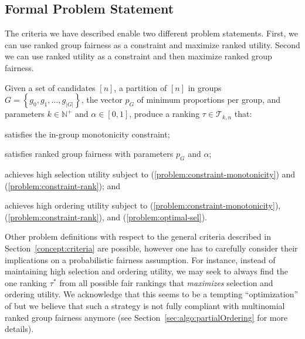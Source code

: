 \subsection{Formal Problem Statement}
\label{subsec:problem-statement}
The criteria we have described enable two different problem statements. First, we can use ranked group fairness as a constraint and maximize ranked utility. Second we can use ranked utility as a constraint and then maximize ranked group fairness.


\begin{problem}
	Given a set of candidates $[n]$, a partition of $[n]$ in groups $G = \left\{g_0, g_1, \ldots, g_{|G|}\right\}$, the vector $p_G$ of minimum proportions per group,  and parameters $k \in \mathbb{N}^+$ and $\alpha \in [0,1]$, produce a ranking $\tau \in {\mathcal T}_{k,n}$ that:
	\begin{compactenum}[(i)]
		\item \label{problem:constraint-monotonicity} satisfies the in-group monotonicity constraint;
		\item \label{problem:constraint-rank} satisfies ranked group fairness with parameters $p_G$ and $\alpha$;
		\item \label{problem:optimal-sel} achieves high selection utility subject to (\ref{problem:constraint-monotonicity}) and (\ref{problem:constraint-rank}); and
		\item \label{problem:maximum-ord} achieves high ordering utility subject to (\ref{problem:constraint-monotonicity}), (\ref{problem:constraint-rank}), and (\ref{problem:optimal-sel}).
	\end{compactenum}
\end{problem}

\label{concept:related-problems}
%
Other problem definitions with respect to the general criteria described in Section~\ref{concept:criteria} are possible, however one has to carefully consider their implications on a probabilistic fairness assumption.
%
For instance, instead of maintaining high selection and ordering utility, we may seek to always find the one ranking $\tau^*$ from all possible fair rankings that \emph{maximizes} selection and ordering utility.
%
We acknowledge that this seems to be a tempting ``optimization'' of \algoFAIR but we believe that such a strategy is not fully compliant with multinomial ranked group fairness anymore (see Section~\ref{sec:algo:partialOrdering} for more details).
